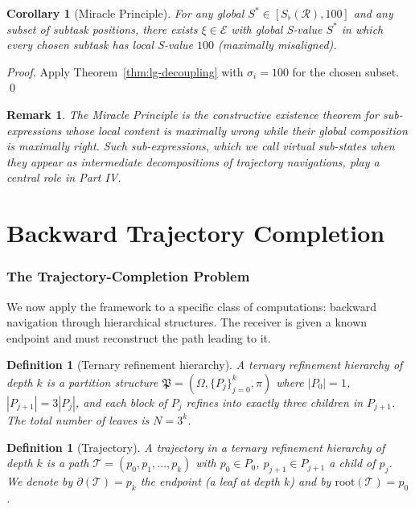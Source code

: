\documentclass[twocolumn,a4paper]{article}
\newtheorem{corollary}[theorem]{Corollary}
\newtheorem{definition}[theorem]{Definition}
\newtheorem{remark}[theorem]{Remark}
\newcommand{\Expr}{\mathcal{E}}
\newcommand{\receiver}{\mathcal{R}}
\newcommand{\Sscalar}{S}
\newcommand{\Sfloor}{S_{\flat}}
\newcommand{\PPart}{\mathfrak{P}}
\newcommand{\Trajec}{\mathcal{T}}
\newcommand{\Endp}{\partial}
\begin{document}
\begin{corollary}[Miracle Principle]
\label{cor:miracle}
For any global $\Sscalar^{*}\in[\Sfloor(\receiver),100]$ and any subset of subtask positions, there exists $\xi\in\Expr$ with global S-value $\Sscalar^{*}$ in which every chosen subtask has local S-value $100$ (maximally misaligned).
\end{corollary}

\begin{proof}
Apply Theorem~\ref{thm:lg-decoupling} with $\sigma_{i}=100$ for the chosen subset. \qed
\end{proof}

\begin{remark}
The Miracle Principle is the constructive existence theorem for sub-expressions whose local content is maximally wrong while their global composition is maximally right. Such sub-expressions, which we call \emph{virtual sub-states} when they appear as intermediate decompositions of trajectory navigations, play a central role in Part IV.
\end{remark}

\part{Backward Trajectory Completion}

\section{The Trajectory-Completion Problem}
\label{sec:trajectory-problem}

We now apply the framework to a specific class of computations: backward navigation through hierarchical structures. The receiver is given a known endpoint and must reconstruct the path leading to it.

\begin{definition}[Ternary refinement hierarchy]
\label{def:ternary-hierarchy}
A \emph{ternary refinement hierarchy} of depth $k$ is a partition structure $\PPart=(\Omega,\{P_{j}\}_{j=0}^{k},\pi)$ where $|P_{0}|=1$, $|P_{j+1}|=3|P_{j}|$, and each block of $P_{j}$ refines into exactly three children in $P_{j+1}$. The total number of leaves is $N=3^{k}$.
\end{definition}

\begin{definition}[Trajectory]
\label{def:trajectory}
A \emph{trajectory} in a ternary refinement hierarchy of depth $k$ is a path $\Trajec=(p_{0},p_{1},\ldots,p_{k})$ with $p_{0}\in P_{0}$, $p_{j+1}\in P_{j+1}$ a child of $p_{j}$. We denote by $\Endp(\Trajec)=p_{k}$ the \emph{endpoint} (a leaf at depth $k$) and by $\mathrm{root}(\Trajec)=p_{0}$.
\end{definition}
\end{document}
